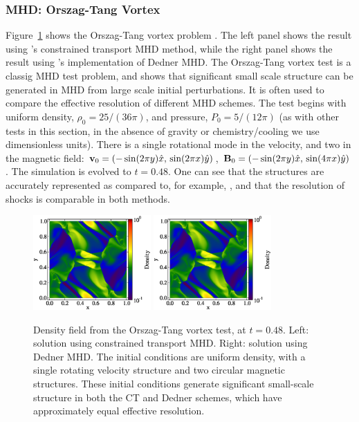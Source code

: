 \subsubsection{MHD: Orszag-Tang Vortex}
\label{sec.tests.mhd}
Figure~\ref{fig.orszag} shows the Orszag-Tang vortex problem \citep{Orszag79}.  The left panel shows
the result using \enzo's constrained transport MHD method, while the right panel shows the result using
\enzo's implementation of Dedner MHD.
The Orszag-Tang vortex test is a classig MHD test problem, and shows that significant small scale structure can be generated in MHD
from large scale initial perturbations.  It is often used to compare the
effective resolution of different MHD schemes.  The test begins with uniform
density, $\rho_0=25/(36\pi)$, and pressure, $P_0=5/(12\pi)$ (as with
other tests in this section, in the absence of gravity or chemistry/cooling we use
dimensionless units).  There is a
single rotational mode in the velocity, and two in the magnetic field:
${\bf v}_0 = (-\sin(2\pi y) \hat{x},\, \sin(2\pi x) \hat{y})$,
${\bf B}_0 = (-\sin(2\pi y) \hat{x},\, \sin(4\pi x) \hat{y})$.
The simulation is evolved to $t=0.48$.  One can see that the structures
are accurately represented as compared to, for example,
\citet{Toth00}, and that the resolution of shocks is comparable in
both methods.

\begin{figure}
\begin{center}
\includegraphics[width=0.4\textwidth]{figures/MHDCT_OrszagTang_Density.eps}
\includegraphics[width=0.4\textwidth]{figures/MHDDedner_OrszagTang_Density.eps}
\caption{Density field from the Orszag-Tang vortex test, at $t=0.48$.
Left: solution using constrained transport MHD.  Right: solution using
Dedner MHD. The initial conditions are uniform density, with a single
rotating velocity structure and two circular magnetic structures.
These initial conditions generate significant small-scale structure in
both the CT and Dedner schemes, which have approximately equal
effective resolution.}
\label{fig.orszag}
\end{center}
\end{figure}
